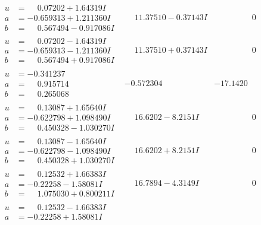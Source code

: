 \documentclass[1p]{elsarticle_modified}
\theoremstyle{definition}
\begin{document}
$$\begin{array}{c|c|c}
\begin{aligned}
u &= \phantom{-}0.07202 + 1.64319 I \\
a &= -0.659313 + 1.211360 I \\
b &= \phantom{-}0.567494 - 0.917086 I\end{aligned}
 & \phantom{-}11.37510 - 0.37143 I & \phantom{-0.000000 } 0 \\ \hline\begin{aligned}
u &= \phantom{-}0.07202 - 1.64319 I \\
a &= -0.659313 - 1.211360 I \\
b &= \phantom{-}0.567494 + 0.917086 I\end{aligned}
 & \phantom{-}11.37510 + 0.37143 I & \phantom{-0.000000 } 0 \\ \hline\begin{aligned}
u &= -0.341237\phantom{ +0.000000I} \\
a &= \phantom{-}0.915714\phantom{ +0.000000I} \\
b &= \phantom{-}0.265068\phantom{ +0.000000I}\end{aligned}
 & -0.572304\phantom{ +0.000000I} & -17.1420\phantom{ +0.000000I} \\ \hline\begin{aligned}
u &= \phantom{-}0.13087 + 1.65640 I \\
a &= -0.622798 + 1.098490 I \\
b &= \phantom{-}0.450328 - 1.030270 I\end{aligned}
 & \phantom{-}16.6202 - 8.2151 I & \phantom{-0.000000 } 0 \\ \hline\begin{aligned}
u &= \phantom{-}0.13087 - 1.65640 I \\
a &= -0.622798 - 1.098490 I \\
b &= \phantom{-}0.450328 + 1.030270 I\end{aligned}
 & \phantom{-}16.6202 + 8.2151 I & \phantom{-0.000000 } 0 \\ \hline\begin{aligned}
u &= \phantom{-}0.12532 + 1.66383 I \\
a &= -0.22258 - 1.58081 I \\
b &= \phantom{-}1.075030 + 0.800211 I\end{aligned}
 & \phantom{-}16.7894 - 4.3149 I & \phantom{-0.000000 } 0 \\ \hline\begin{aligned}
u &= \phantom{-}0.12532 - 1.66383 I \\
a &= -0.22258 + 1.58081 I \\

\end{aligned}
\end{array}$$
\end{document}
